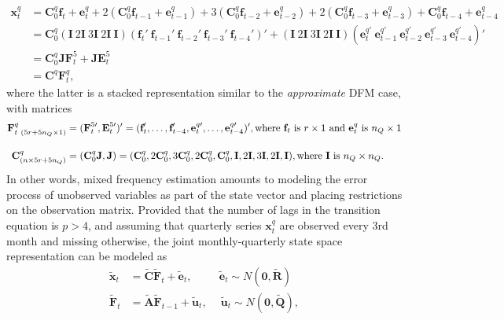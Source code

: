 \documentclass[a4paper]{article}
\begin{document}
\begin{align} 
\textbf{x}^q_t &= \textbf{C}_0^q\textbf{f}_t + \textbf{e}^q_t + 2(\textbf{C}_0^q\textbf{f}_{t-1} + \textbf{e}^q_{t-1}) + 3(\textbf{C}_0^q\textbf{f}_{t-2} + \textbf{e}^q_{t-2}) + 2(\textbf{C}_0^q\textbf{f}_{t-3} + \textbf{e}^q_{t-3}) + \textbf{C}_0^q\textbf{f}_{t-4} + \textbf{e}^q_{t-4} \\
&= \textbf{C}_0^q (\textbf{I}\ 2\textbf{I}\ 3\textbf{I}\ 2\textbf{I}\ \textbf{I})(\textbf{f}_t'\ \textbf{f}_{t-1}'\ \textbf{f}_{t-2}'\ \textbf{f}_{t-3}'\ \textbf{f}_{t-4}')' + (\textbf{I}\ 2\textbf{I}\ 3\textbf{I}\ 2\textbf{I}\ \textbf{I})(\textbf{e}^{q\prime}_t\ \textbf{e}^{q\prime}_{t-1}\ \textbf{e}^{q\prime}_{t-2}\ \textbf{e}^{q\prime}_{t-3}\ \textbf{e}^{q\prime}_{t-4})' \\
&= \textbf{C}_0^q\textbf{J}\textbf{F}^5_t + \textbf{J}\textbf{E}^5_t \\
&= \textbf{C}^q\textbf{F}^q_t,
\end{align}
where the latter is a stacked representation similar to the \emph{approximate} DFM case, with matrices
\begin{align} \label{eq:Ftmf}
\textbf{F}^q_{t\ (5r+5n_Q \times 1)}  &= (\textbf{F}^{5\prime}_t, \textbf{E}_t^{5\prime})' = (\textbf{f}_t', \dots, \textbf{f}_{t-4}', \textbf{e}^{q\prime}_t, \dots, \textbf{e}^{q\prime}_{t-4})', \text{where $\textbf{f}_t$ is $r\times 1$ and $\textbf{e}^q_t$ is $n_Q\times 1$} \\[1em]
\textbf{C}^q_{(n \times 5r+5n_Q)}  &= (\textbf{C}_0^q\textbf{J}, \textbf{J}) = (\textbf{C}_0^q, 2\textbf{C}_0^q, 3\textbf{C}_0^q, 2\textbf{C}_0^q, \textbf{C}_0^q, \textbf{I}, 2\textbf{I}, 3\textbf{I}, 2\textbf{I}, \textbf{I}), \text{where \textbf{I} is $n_Q\times n_Q$.}
\end{align}
In other words, mixed frequency estimation amounts to modeling the error process of unobserved variables as part of the state vector and placing restrictions on the observation matrix. Provided that the number of lags in the transition equation is $p > 4$, and assuming that quarterly series $\textbf{x}_t^q$ are observed every 3rd month and missing otherwise, the joint monthly-quarterly state space representation can be modeled as 
\begin{align} \label{eq:domf}
\tilde{\textbf{x}}_t &= \tilde{\textbf{C}} \tilde{\textbf{F}}_t + \tilde{\textbf{e}}_t, \ \qquad\ \tilde{\textbf{e}}_t\sim  N(\textbf{0}, \tilde{\textbf{R}}) \\
\tilde{\textbf{F}}_t &= \tilde{\textbf{A}}\tilde{\textbf{F}}_{t-1} + \tilde{\textbf{u}}_t, \quad\ \tilde{\textbf{u}}_t\sim  N(\textbf{0}, \tilde{\textbf{Q}}),
\end{align}
\end{document}
